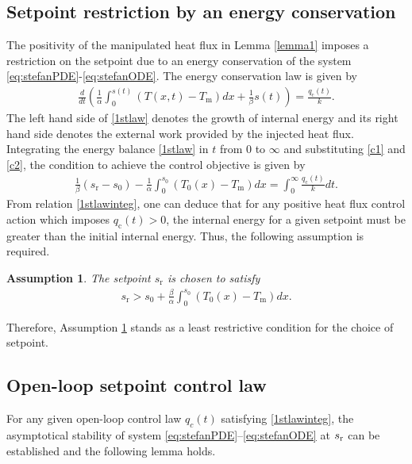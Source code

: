 \documentclass[journal]{IEEEtran}
\newtheorem{assum}{Assumption}
\begin{document}
\subsection{Setpoint restriction by an energy conservation}
The positivity of the manipulated heat flux in Lemma \ref{lemma1} imposes a restriction on the setpoint due to an energy conservation of the system \eqref{eq:stefanPDE}-\eqref{eq:stefanODE}. The energy conservation law is given by
\begin{align}\label{1stlaw}
\frac{d}{dt}\left(\frac{1}{\alpha}\int_0^{s(t)} (T(x,t)-T_{{\mathrm m}}) dx +\frac{1}{\beta} s(t)\right) = \frac{q_{{\mathrm c}}(t)}{k}. 
\end{align} 
The left hand side of \eqref{1stlaw} denotes the growth of internal energy and its right hand side denotes the external work provided by the injected heat flux. Integrating  the energy balance  \eqref{1stlaw} in $t$ from $0$ to $\infty$ and substituting  \eqref{c1} and \eqref{c2}, the condition to achieve the control objective is given by
 \begin{align}\label{1stlawinteg}
\frac{1}{\beta}(s_{{\mathrm r}}-s_0)-\frac{1}{\alpha}\int_{0}^{s_0} (T_0(x)-T_{{\mathrm m}}) dx = \int_0^{\infty} \frac{q_{{\mathrm c}}(t)}{k} dt .
\end{align}
From relation  \eqref{1stlawinteg}, one can deduce that for any positive heat flux control action which imposes $q_{{\mathrm c}}(t)>0$, the internal energy for a given setpoint must be greater than the initial internal energy. Thus, the following assumption is required.
\begin{assum}\label{assumsetpoint}
The setpoint $s_{{\mathrm r}}$ is chosen to satisfy 
\begin{align}\label{compatibility}
s_{{\mathrm r}}>s_0+\frac{\beta}{\alpha }\int_{0}^{s_0} (T_0(x)-T_{{\mathrm m}}) dx. 
\end{align}
\end{assum}
Therefore, Assumption \ref{assumsetpoint} stands as a least restrictive condition for the choice of setpoint. 
\subsection{Open-loop setpoint control law }\label{sec:pulse}

For any given open-loop  control law $q_c(t)$ satisfying \eqref{1stlawinteg}, the asymptotical stability of system \eqref{eq:stefanPDE}--\eqref{eq:stefanODE} at $s_{\rm r}$ can be  established and the following lemma holds.
\end{document}
